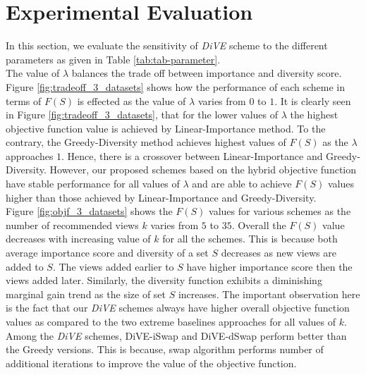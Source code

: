 

\section{Experimental Evaluation}\label{sec:experimental_evaluation}
In this section, we evaluate the sensitivity of \textit{DiVE} scheme to the different parameters as given in Table \ref{tab:tab-parameter}.\\

{}
The value of $\lambda$ balances the trade off between importance and diversity score. Figure \ref{fig:tradeoff_3_datasets} shows how the performance of each scheme in terms of $F\left(S\right)$ is effected as the value of  $\lambda$ varies from $0$ to $1$. It is clearly seen in Figure \ref{fig:tradeoff_3_datasets}, that for the lower values of $\lambda$ the highest objective function value is achieved by Linear-Importance method. To the contrary, the Greedy-Diversity method achieves highest values of $F\left(S\right)$ as the $\lambda$ approaches $1$. Hence, there is a crossover between Linear-Importance and Greedy-Diversity. However, our proposed schemes based on the hybrid objective function have stable performance for all values of $\lambda$ and are able to achieve $F\left(S\right)$ values higher than those achieved by Linear-Importance and Greedy-Diversity. \\



{} 
Figure \ref{fig:objf_3_datasets} shows the $F\left(S\right)$ values for various schemes as the number of recommended views $k$ varies from $5$ to $35$. Overall the $F\left(S\right)$ value decreases with increasing value of $k$ for all the schemes. This is because both average importance score and diversity of a set $S$ decreases as new views are added to $S$. The views added earlier to $S$ have higher importance score then the views added later. Similarly, the diversity function exhibits a diminishing
marginal gain trend as the size of set $S$ increases. The important observation here is the fact that our {\em DiVE} schemes always have higher overall objective function values as compared to the two extreme baselines approaches for all values of $k$. Among the {\em DiVE} schemes, DiVE-iSwap and DiVE-dSwap perform better than the Greedy versions. This is because, swap algorithm performs number of additional iterations to improve the value of the objective function.



